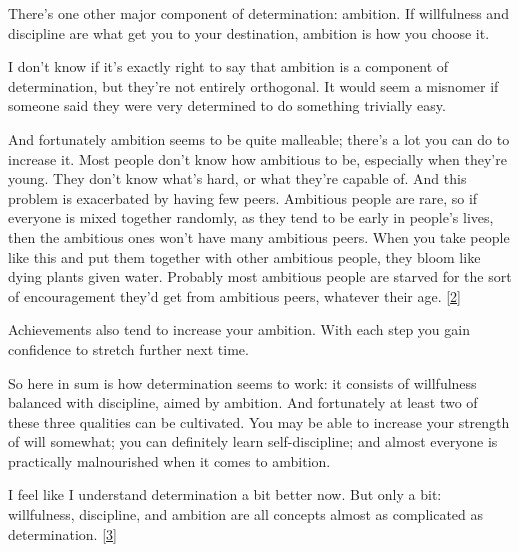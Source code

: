 There's one other
                    major component of determination: ambition. If willfulness
                    and discipline are what get you to your destination,
                    ambition is how you choose it.

I don't know if
                    it's exactly right to say that ambition is a component of
                    determination, but they're not entirely orthogonal. It would
                    seem a misnomer if someone said they were very determined to
                    do something trivially easy.

And fortunately
                    ambition seems to be quite malleable; there's a lot you can
                    do to increase it. Most people don't know how ambitious to
                    be, especially when they're young. They don't know what's
                    hard, or what they're capable of. And this problem is
                    exacerbated by having few peers. Ambitious people are rare,
                    so if everyone is mixed together randomly, as they tend to
                    be early in people's lives, then the ambitious ones won't
                    have many ambitious peers. When you take people like this
                    and put them together with other ambitious people, they
                    bloom like dying plants given water. Probably most ambitious
                    people are starved for the sort of encouragement they'd get
                    from ambitious peers, whatever their age.
                    [\href{\#f2n}{2}]

Achievements also tend to increase your
                    ambition. With each step you gain confidence to stretch
                    further next time.

So here in sum is how
                    determination seems to work: it consists of willfulness
                    balanced with discipline, aimed by ambition. And fortunately
                    at least two of these three qualities can be cultivated. You
                    may be able to increase your strength of will somewhat; you
                    can definitely learn self-discipline; and almost everyone is
                    practically malnourished when it comes to ambition.

I
                    feel like I understand determination a bit better now. But
                    only a bit: willfulness, discipline, and ambition are all
                    concepts almost as complicated as determination.
                    [\href{\#f3n}{3}]

